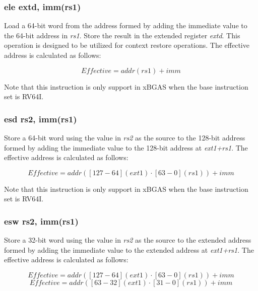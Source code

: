 \documentclass{article}
\begin{document}
\subsubsection{ele extd, imm(rs1)}
Load a 64-bit word from the address formed by adding the immediate value to the 
64-bit address in \textit{rs1}.  Store the result in the extended register \textit{extd}.  
This operation is designed to be utilized for context restore operations.  The effective 
address is calculated as follows: 

\begin{equation}
Effective = addr(rs1)+imm
\end{equation}

\begin{commentary}
Note that this instruction is only support in xBGAS when the base 
instruction set is RV64I.
\end{commentary}

\subsubsection{esd rs2, imm(rs1)}
Store a 64-bit word using the value in \textit{rs2} as the source 
to the 128-bit address formed by adding the immediate value to the 
128-bit address at \textit{ext1+rs1}.  The effective address is calculated 
as follows: 

\begin{equation}
Effective = addr([127-64](ext1) \cdot [63-0](rs1))+imm
\end{equation}

\begin{commentary}
Note that this instruction is only support in xBGAS when the base 
instruction set is RV64I.
\end{commentary}

\subsubsection{esw rs2, imm(rs1)}
Store a 32-bit word using the value in \textit{rs2} as the source 
to the extended address formed by adding the immediate value to the 
extended address at \textit{ext1+rs1}.  The effective address is calculated 
as follows: 

\begin{equation}
Effective = addr([127-64](ext1) \cdot [63-0](rs1))+imm
\end{equation}
\begin{equation}
Effective = addr([63-32](ext1) \cdot [31-0](rs1))+imm
\end{equation}
\end{document}
